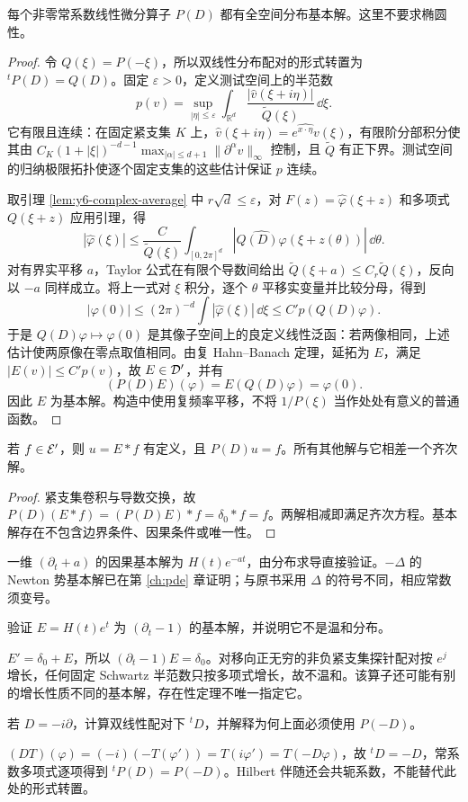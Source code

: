 \begin{theorem}\label{thm:y6-malgrange}
每个非零常系数线性微分算子 $P(D)$ 都有全空间分布基本解。这里不要求椭圆性。
\end{theorem}
\begin{proof}
令 $Q(\xi)=P(-\xi)$，所以双线性分布配对的形式转置为 ${}^tP(D)=Q(D)$。固定 $\varepsilon>0$，定义测试空间上的半范数
\[
 p(v)=\sup_{|\eta|\le\varepsilon}\int_{\mathbb R^d}
 \frac{|\widehat v(\xi+i\eta)|}{\widetilde Q(\xi)}\,\dd\xi.
\]
它有限且连续：在固定紧支集 $K$ 上，$\widehat v(\xi+i\eta)=\widehat{e^{x\cdot\eta}v}(\xi)$，有限阶分部积分使其由 $C_K(1+|\xi|)^{-d-1}\max_{|\alpha|\le d+1}\|\partial^\alpha v\|_\infty$ 控制，且 $\widetilde Q$ 有正下界。测试空间的归纳极限拓扑使逐个固定支集的这些估计保证 $p$ 连续。

取引理 \ref{lem:y6-complex-average} 中 $r\sqrt d\le\varepsilon$，对 $F(z)=\widehat\varphi(\xi+z)$ 和多项式 $Q(\xi+z)$ 应用引理，得
\[
 |\widehat\varphi(\xi)|\le\frac C{\widetilde Q(\xi)}
 \int_{[0,2\pi]^d}|\widehat{Q(D)\varphi}(\xi+z(\theta))|\,\dd\theta.
\]
对有界实平移 $a$，Taylor 公式在有限个导数间给出
$\widetilde Q(\xi+a)\le C_r\widetilde Q(\xi)$，反向以 $-a$ 同样成立。将上一式对 $\xi$ 积分，逐个 $\theta$ 平移实变量并比较分母，得到
\[
 |\varphi(0)|\le(2\pi)^{-d}\int|\widehat\varphi(\xi)|\,\dd\xi
 \le C' p(Q(D)\varphi).
\]
于是 $Q(D)\varphi\mapsto\varphi(0)$ 是其像子空间上的良定义线性泛函：若两像相同，上述估计使两原像在零点取值相同。由复 Hahn--Banach 定理，延拓为 $E$，满足 $|E(v)|\le C'p(v)$，故 $E\in\mathcal{D}'$，并有
\[
 (P(D)E)(\varphi)=E(Q(D)\varphi)=\varphi(0).
\]
因此 $E$ 为基本解。构造中使用复频率平移，不将 $1/P(\xi)$ 当作处处有意义的普通函数。
\end{proof}

\begin{corollary}[紧支集右端的求解]
若 $f\in\mathcal{E}'$，则 $u=E*f$ 有定义，且 $P(D)u=f$。所有其他解与它相差一个齐次解。
\end{corollary}
\begin{proof}
紧支集卷积与导数交换，故 $P(D)(E*f)=(P(D)E)*f=\delta_0*f=f$。两解相减即满足齐次方程。基本解存在不包含边界条件、因果条件或唯一性。
\end{proof}

一维 $(\partial_t+a)$ 的因果基本解为 $H(t)e^{-at}$，由分布求导直接验证。$-\Delta$ 的 Newton 势基本解已在第 \ref{ch:pde} 章证明；与原书采用 $\Delta$ 的符号不同，相应常数须变号。

\begin{exercise}[基本解可不温和]\label{ex:y6-growing-fundamental}
验证 $E=H(t)e^t$ 为 $(\partial_t-1)$ 的基本解，并说明它不是温和分布。
\end{exercise}
\begin{solution}
$E'=\delta_0+E$，所以 $(\partial_t-1)E=\delta_0$。对移向正无穷的非负紧支集探针配对按 $e^j$ 增长，任何固定 Schwartz 半范数只按多项式增长，故不温和。该算子还可能有别的增长性质不同的基本解，存在性定理不唯一指定它。
\end{solution}

\begin{exercise}[形式转置的负号]\label{ex:y6-transpose}
若 $D=-i\partial$，计算双线性配对下 ${}^tD$，并解释为何上面必须使用 $P(-D)$。
\end{exercise}
\begin{solution}
$(DT)(\varphi)=(-i)(-T(\varphi'))=T(i\varphi')=T(-D\varphi)$，故 ${}^tD=-D$，常系数多项式逐项得到 ${}^tP(D)=P(-D)$。Hilbert 伴随还会共轭系数，不能替代此处的形式转置。
\end{solution}
